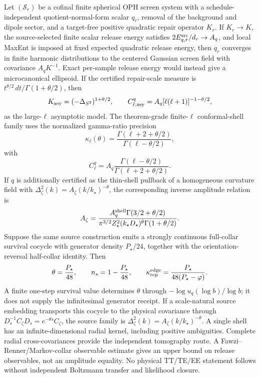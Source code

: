 \begin{theorem}\label{thm:compact-conditional-screen-spectrum}
Let \((\mathcal S_r)\) be a cofinal finite spherical OPH screen system with a
schedule-independent quotient-normal-form scalar \(q_r\), removal of the background and dipole
sector, and a target-free positive quadratic repair operator \(K_r\). If \(K_r\to K\), the source-selected
finite scalar release energy satisfies \(2E^{\rm src}_{q,r}/d_r\to A_q\), and local MaxEnt is imposed at fixed expected
quadratic release energy, then \(q_r\) converges in finite harmonic distributions to the centered
Gaussian screen field with covariance \(A_qK^{-1}\). Exact per-sample release energy would instead
give a microcanonical ellipsoid. If the certified repair-scale measure is
\(t^{\theta/2}\,dt/\Gamma(1+\theta/2)\), then
\[
K_{\rm asy}=(-\Delta_{S^2})^{1+\theta/2},
\qquad
C_{\ell,{\rm asy}}^q=A_q[\ell(\ell+1)]^{-1-\theta/2},
\]
as the large-\(\ell\) asymptotic model.  The theorem-grade finite-\(\ell\) conformal-shell family
uses the normalized gamma-ratio precision
\[
\kappa_\ell(\theta)=
\frac{\Gamma(\ell+2+\theta/2)}{\Gamma(\ell-\theta/2)},
\]
with
\[
C_\ell^q=A_q\frac{\Gamma(\ell-\theta/2)}{\Gamma(\ell+2+\theta/2)}.
\]
If \(q\) is additionally certified as the thin-shell pullback of a homogeneous curvature field with
\(\Delta_\zeta^2(k)=A_\zeta(k/k_\star)^{-\theta}\), the corresponding inverse amplitude relation is
\[
A_\zeta=
\frac{A_q^{\rm shell}\Gamma(3/2+\theta/2)}
{\pi^{3/2}Z_\star^2(k_\star D_\star)^\theta\Gamma(1+\theta/2)}.
\]
Suppose the same source construction emits a strongly continuous full-collar survival cocycle with
generator density \(P_\star/24\), together with the orientation-reversal half-collar identity. Then
\[
\theta=\frac{P_\star}{48},\qquad
n_s=1-\frac{P_\star}{48},\qquad
\kappa_{\rm rep}^{\rm edge}=\frac{P_\star}{48(P_\star-\varphi)}.
\]
A finite one-step survival value determines \(\theta\) through
\(-\log u_q(\log b)/\log b\); it does not supply the infinitesimal generator receipt. If a
scale-natural source embedding transports this cocycle to the physical covariance through
\(D_s^{-1}C_\zeta D_s=e^{-\theta s}C_\zeta\), the source family is
\(\Delta_\zeta^2(k)=A_\zeta(k/k_\star)^{-\theta}\). A single shell has an
infinite-dimensional radial kernel, including positive ambiguities. Complete radial
cross-covariances provide the independent tomography route. A Fawzi--Renner/Markov-collar observable estimate gives an
upper bound on release observables, not an amplitude equality. No physical TT/TE/EE statement
follows without independent Boltzmann transfer and likelihood closure.
\end{theorem}

